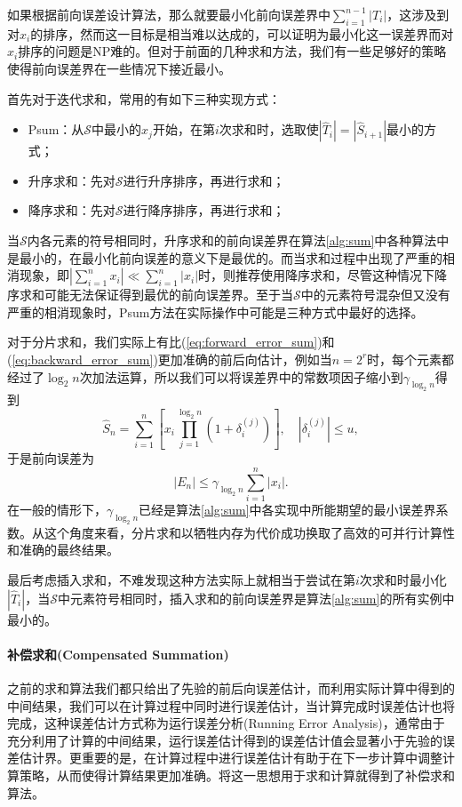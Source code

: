 \documentclass[a4paper,10pt]{ctexart}
\begin{document}
如果根据前向误差设计算法，那么就要最小化前向误差界中$ \sum_{i=1}^{n-1}|T_i| $，这涉及到对$ x_i $的排序，然而这一目标是相当难以达成的，可以证明为最小化这一误差界而对$ x_i $排序的问题是NP难的。但对于前面的几种求和方法，我们有一些足够好的策略使得前向误差界在一些情况下接近最小。

首先对于迭代求和，常用的有如下三种实现方式：
\begin{itemize}
    \item Psum：从$ \mathcal{S} $中最小的$ x_j $开始，在第$ i $次求和时，选取使$ |\hat{T}_i| = |\hat{S}_{i+1}| $最小的方式；
    \item 升序求和：先对$ \mathcal{S} $进行升序排序，再进行求和；
    \item 降序求和：先对$ \mathcal{S} $进行降序排序，再进行求和；
\end{itemize}
当$ \mathcal{S} $内各元素的符号相同时，升序求和的前向误差界在算法\ref{alg:sum}中各种算法中是最小的，在最小化前向误差的意义下是最优的。而当求和过程中出现了严重的相消现象，即$ |\sum_{i=1}^n x_i|\ll\sum_{i=1}^n |x_i| $时，则推荐使用降序求和，尽管这种情况下降序求和可能无法保证得到最优的前向误差界。至于当$ \mathcal{S} $中的元素符号混杂但又没有严重的相消现象时，Psum方法在实际操作中可能是三种方式中最好的选择。

对于分片求和，我们实际上有比(\ref{eq:forward_error_sum})和(\ref{eq:backward_error_sum})更加准确的前后向估计，例如当$ n=2^r $时，每个元素都经过了$ \log_2 n $次加法运算，所以我们可以将误差界中的常数项因子缩小到$ \gamma_{\log_2 n} $得到
\begin{equation}
    \hat{S}_n = \sum_{i=1}^n \left[ x_i\prod_{j=1}^{\log_2 n} (1+\delta_i^{(j)}) \right] ,\quad |\delta_i^{(j)}| \leqslant u,
\end{equation}
于是前向误差为
\begin{equation}
    |E_n| \leqslant \gamma_{\log_2 n} \sum_{i=1}^n |x_i|.
\end{equation}
在一般的情形下，$ \gamma_{\log_2 n} $已经是算法\ref{alg:sum}中各实现中所能期望的最小误差界系数。从这个角度来看，分片求和以牺牲内存为代价成功换取了高效的可并行计算性和准确的最终结果。

最后考虑插入求和，不难发现这种方法实际上就相当于尝试在第$ i $次求和时最小化$ |\hat{T}_i| $，当$ \mathcal{S} $中元素符号相同时，插入求和的前向误差界是算法\ref{alg:sum}的所有实例中最小的。

\paragraph*{补偿求和(Compensated Summation)}
之前的求和算法我们都只给出了先验的前后向误差估计，而利用实际计算中得到的中间结果，我们可以在计算过程中同时进行误差估计，当计算完成时误差估计也将完成，这种误差估计方式称为运行误差分析(Running Error Analysis)，通常由于充分利用了计算的中间结果，运行误差估计得到的误差估计值会显著小于先验的误差估计界。更重要的是，在计算过程中进行误差估计有助于在下一步计算中调整计算策略，从而使得计算结果更加准确。将这一思想用于求和计算就得到了补偿求和算法。
\end{document}
